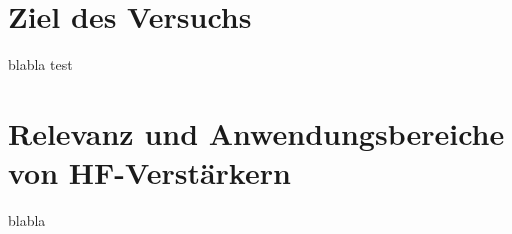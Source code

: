     \section{Ziel des Versuchs}
    blabla test
    \section{Relevanz und Anwendungsbereiche von HF-Verstärkern}
    blabla
\clearpage
